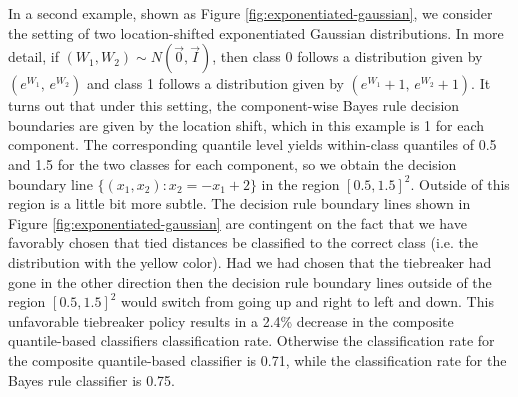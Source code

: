 In a second example, shown as Figure \ref{fig:exponentiated-gaussian}, we
consider the setting of two location-shifted exponentiated Gaussian
distributions.  In more detail, if $(W_1, W_2) \sim N(\vec{0}, \vec{I})$, then
class 0 follows a distribution given by $(e^{W_1},\, e^{W_2})$ and class 1
follows a distribution given by $(e^{W_1} + 1,\, e^{W_2} + 1)$.  It turns out
that under this setting, the component-wise Bayes rule decision boundaries are
given by the location shift, which in this example is 1 for each component.  The
corresponding quantile level yields within-class quantiles of 0.5 and 1.5 for
the two classes for each component, so we obtain the decision boundary line
$\{(x_1, x_2) : x_2 = -x_1 + 2\}$ in the region $[0.5, 1.5]^2$.  Outside of this
region is a little bit more subtle.  The decision rule boundary lines shown in
Figure \ref{fig:exponentiated-gaussian} are contingent on the fact that we have
favorably chosen that tied distances be classified to the correct class
(i.e. the distribution with the yellow color).  Had we had chosen that the
tiebreaker had gone in the other direction then the decision rule boundary lines
outside of the region $[0.5, 1.5]^2$ would switch from going up and right to
left and down.  This unfavorable tiebreaker policy results in a 2.4\% decrease
in the composite quantile-based classifiers classification rate.  Otherwise the
classification rate for the composite quantile-based classifier is 0.71, while
the classification rate for the Bayes rule classifier is 0.75.


